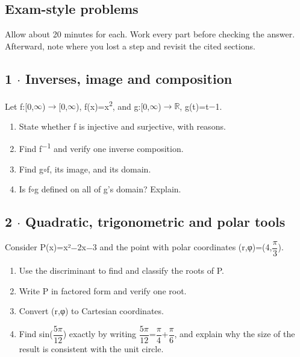 \documentclass[11pt]{article}
\begin{document}
\begin{keepsection}
\section{Exam-style problems}

Allow about 20 minutes for each. Work every part before checking the answer. Afterward, note where you lost a step and revisit the cited sections.

\begin{keepsection}
\subsection{1 \ensuremath{\cdot} Inverses, image and composition}

Let f:[0,\ensuremath{\infty})\ensuremath{\to}[0,\ensuremath{\infty}), f(x)=x\textsuperscript{2}, and g:[0,\ensuremath{\infty})\ensuremath{\to}\ensuremath{\mathbb{R}}, g(t)=t\ensuremath{-}1.

\begin{enumerate}
\item State whether f is injective and surjective, with reasons.
\item Find f\textsuperscript{\ensuremath{-}1} and verify one inverse composition.
\item Find g\ensuremath{\circ}f, its image, and its domain.
\item Is f\ensuremath{\circ}g defined on all of g’s domain? Explain.
\end{enumerate}

\end{keepsection}

\begin{keepsection}
\subsection{2 \ensuremath{\cdot} Quadratic, trigonometric and polar tools}

Consider P(x)=x²\ensuremath{-}2x\ensuremath{-}3 and the point with polar coordinates (r,φ)=(4,{\small\ensuremath{\dfrac{π}{3}}}).

\begin{enumerate}
\item Use the discriminant to find and classify the roots of P.
\item Write P in factored form and verify one root.
\item Convert (r,φ) to Cartesian coordinates.
\item Find sin({\small\ensuremath{\dfrac{5π}{12}}}) exactly by writing {\small\ensuremath{\dfrac{5π}{12}}}={\small\ensuremath{\dfrac{π}{4}}}+{\small\ensuremath{\dfrac{π}{6}}}, and explain why the size of the result is consistent with the unit circle.
\end{enumerate}


\end{keepsection}
\end{keepsection}
\end{document}
